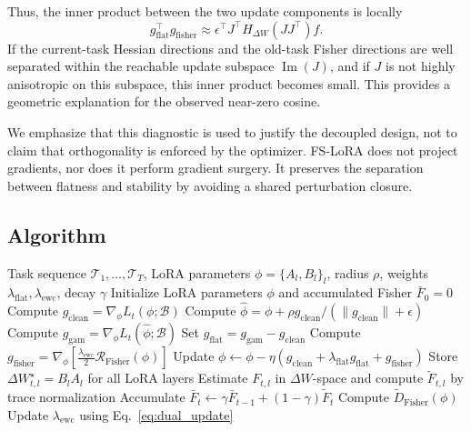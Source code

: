 Thus, the inner product between the two update components is locally
\begin{equation}
g_{\mathrm{flat}}^\top g_{\mathrm{fisher}}
\approx
\epsilon^\top
J^\top
H_{\Delta W}
(JJ^\top)
f.
\label{eq:flat_fisher_inner}
\end{equation}
If the current-task Hessian directions and the old-task Fisher directions are well separated within the reachable update subspace $\operatorname{Im}(J)$, and if $J$ is not highly anisotropic on this subspace, this inner product becomes small.
This provides a geometric explanation for the observed near-zero cosine.

We emphasize that this diagnostic is used to justify the decoupled design, not to claim that orthogonality is enforced by the optimizer.
FS-LoRA does not project gradients, nor does it perform gradient surgery.
It preserves the separation between flatness and stability by avoiding a shared perturbation closure.

\subsection{Algorithm}
\label{sec:algorithm}

\begin{algorithm}[t]
\caption{FS-LoRA Training}
\label{alg:fslora}
\begin{algorithmic}[1]
\Require Task sequence $\mathcal T_1,\ldots,\mathcal T_T$, LoRA parameters $\phi=\{A_l,B_l\}_l$, radius $\rho$, weights $\lambda_{\mathrm{flat}},\lambda_{\mathrm{ewc}}$, decay $\gamma$
\State Initialize LoRA parameters $\phi$ and accumulated Fisher $\bar F_0=0$
        \State Compute $g_{\mathrm{clean}}=\nabla_{\phi}L_t(\phi;\mathcal B)$
        \State Compute $\hat{\phi}=\phi+\rho g_{\mathrm{clean}}/(\|g_{\mathrm{clean}}\|+\epsilon)$
        \State Compute $g_{\mathrm{gam}}=\nabla_{\phi}L_t(\hat{\phi};\mathcal B)$
        \State Set $g_{\mathrm{flat}}=g_{\mathrm{gam}}-g_{\mathrm{clean}}$
        \State Compute $g_{\mathrm{fisher}}=\nabla_{\phi}\left[\frac{\lambda_{\mathrm{ewc}}}{2}\mathcal R_{\mathrm{Fisher}}(\phi)\right]$
        \State Update $\phi\leftarrow\phi-\eta\left(g_{\mathrm{clean}}+\lambda_{\mathrm{flat}}g_{\mathrm{flat}}+g_{\mathrm{fisher}}\right)$
    \EndFor
    \State Store $\Delta W_{t,l}^{\star}=B_lA_l$ for all LoRA layers
    \State Estimate $F_{t,l}$ in $\Delta W$-space and compute $\widetilde F_{t,l}$ by trace normalization
    \State Accumulate $\bar F_t\leftarrow\gamma\bar F_{t-1}+(1-\gamma)\widetilde F_t$
        \State Compute $\widetilde D_{\mathrm{Fisher}}(\phi)$
        \State Update $\lambda_{\mathrm{ewc}}$ using Eq.~\eqref{eq:dual_update}
    \EndIf
\EndFor
\end{algorithmic}
\end{algorithm}